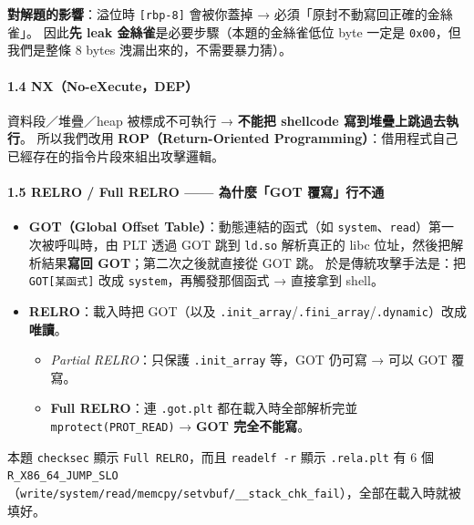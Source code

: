 \documentclass[10pt,a4paper]{article}
\providecommand{\tightlist}{%
  \setlength{\itemsep}{0pt}\setlength{\parskip}{0pt}}
\begin{document}
\textbf{對解題的影響}：溢位時 \texttt{{[}rbp-\allowbreak{}8{]}} 會被你蓋掉 →
必須「原封不動寫回正確的金絲雀」。 因此\textbf{先 leak
金絲雀}是必要步驟（本題的金絲雀低位 byte 一定是
\texttt{0x00}，但我們是整條 8 bytes 洩漏出來的，不需要暴力猜）。

\paragraph{1.4 NX（No-eXecute，DEP）}\label{nxno-executedep}

資料段／堆疊／heap 被標成不可執行 → \textbf{不能把 shellcode
寫到堆疊上跳過去執行}。 所以我們改用 \textbf{ROP（Return-Oriented
Programming）}：借用程式自己已經存在的指令片段來組出攻擊邏輯。

\paragraph{1.5 RELRO / Full RELRO ------ 為什麼「GOT
覆寫」行不通}\label{relro-full-relro-ux70baux4ec0ux9ebcgot-ux8986ux5bebux884cux4e0dux901a}

\begin{itemize}
\tightlist
\item
  \textbf{GOT（Global Offset Table）}：動態連結的函式（如
  \texttt{system}、\texttt{read}）第一次被呼叫時，由 PLT 透過 GOT 跳到
  \texttt{ld.\allowbreak{}so} 解析真正的 libc 位址，然後把解析結果\textbf{寫回
  GOT}；第二次之後就直接從 GOT 跳。 於是傳統攻擊手法是：把
  \texttt{GOT{[}某函式{]}} 改成 \texttt{system}，再觸發那個函式 →
  直接拿到 shell。
\item
  \textbf{RELRO}：載入時把 GOT（以及
  \texttt{.\allowbreak{}init\_\allowbreak{}array}/\texttt{.\allowbreak{}fini\_\allowbreak{}array}/\texttt{.\allowbreak{}dynamic}）改成\textbf{唯讀}。

  \begin{itemize}
  \tightlist
  \item
    \emph{Partial RELRO}：只保護 \texttt{.\allowbreak{}init\_\allowbreak{}array} 等，GOT 仍可寫 →
    可以 GOT 覆寫。
  \item
    \textbf{Full RELRO}：連 \texttt{.\allowbreak{}got.\allowbreak{}plt} 都在載入時全部解析完並
    \texttt{mprotect(PROT\_\allowbreak{}READ)} → \textbf{GOT 完全不能寫}。
  \end{itemize}
\end{itemize}

本題 \texttt{checksec} 顯示 \texttt{Full\ \allowbreak{}RELRO}，而且
\texttt{readelf\ \allowbreak{}-\allowbreak{}r} 顯示 \texttt{.\allowbreak{}rela.\allowbreak{}plt} 有 6 個
\texttt{R\_\allowbreak{}X86\_\allowbreak{}64\_\allowbreak{}JUMP\_\allowbreak{}SLO}（\texttt{write/\allowbreak{}system/\allowbreak{}read/\allowbreak{}memcpy/\allowbreak{}setvbuf/\allowbreak{}\_\allowbreak{}\_\allowbreak{}stack\_\allowbreak{}chk\_\allowbreak{}fail}），全部在載入時就被填好。
\end{document}
